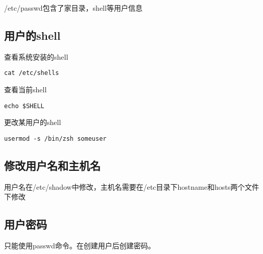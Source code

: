 /etc/passwd包含了家目录，shell等用户信息

\subsection{用户的shell}
查看系统安装的shell
\begin{verbatim}
cat /etc/shells
\end{verbatim}

查看当前shell
\begin{verbatim}
echo $SHELL
\end{verbatim}

更改某用户的shell
\begin{verbatim}
usermod -s /bin/zsh someuser
\end{verbatim}


\subsection{修改用户名和主机名}
用户名在/etc/shadow中修改，主机名需要在/etc目录下hostname和hosts两个文件下修改

\subsection{用户密码}
只能使用passwd命令。在创建用户后创建密码。
